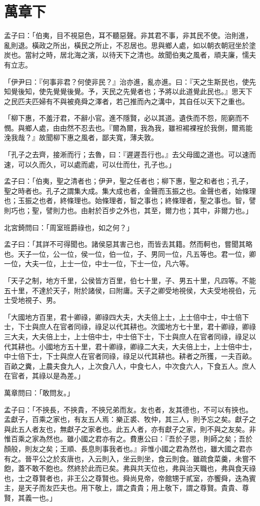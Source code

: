 \documentclass[12pt,a4paper]{ctexbook}
\begin{document}
\section{萬章下}
孟子曰：「伯夷，目不視惡色，耳不聽惡聲。非其君不事，非其民不使。治則進，亂則退。橫政之所出，橫民之所止，不忍居也。思與鄉人處，如以朝衣朝冠坐於塗炭也。當紂之時，居北海之濱，以待天下之清也。故聞伯夷之風者，頑夫廉，懦夫有立志。\par
「伊尹曰：『何事非君？何使非民？』治亦進，亂亦進。曰：『天之生斯民也，使先知覺後知，使先覺覺後覺。予，天民之先覺者也；予將以此道覺此民也。』思天下之民匹夫匹婦有不與被堯舜之澤者，若己推而內之溝中，其自任以天下之重也。\par
「柳下惠，不羞汙君，不辭小官。進不隱賢，必以其道。遺佚而不怨，阨窮而不憫。與鄉人處，由由然不忍去也。『爾為爾，我為我，雖袒裼裸裎於我側，爾焉能浼我哉？』故聞柳下惠之風者，鄙夫寬，薄夫敦。\par
「孔子之去齊，接淅而行；去魯，曰：『遲遲吾行也。』去父母國之道也。可以速而速，可以久而久，可以處而處，可以仕而仕，孔子也。」\par
孟子曰：「伯夷，聖之清者也；伊尹，聖之任者也；柳下惠，聖之和者也；孔子，聖之時者也。孔子之謂集大成。集大成也者，金聲而玉振之也。金聲也者，始條理也；玉振之也者，終條理也。始條理者，智之事也；終條理者，聖之事也。智，譬則巧也；聖，譬則力也。由射於百步之外也，其至，爾力也；其中，非爾力也。」\par
北宮錡問曰：「周室班爵祿也，如之何？」\par
孟子曰：「其詳不可得聞也。諸侯惡其害己也，而皆去其籍。然而軻也，嘗聞其略也。天子一位，公一位，侯一位，伯一位，子、男同一位，凡五等也。君一位，卿一位，大夫一位，上士一位，中士一位，下士一位，凡六等。\par
「天子之制，地方千里，公侯皆方百里，伯七十里，子、男五十里，凡四等。不能五十里，不達於天子，附於諸侯，曰附庸。天子之卿受地視侯，大夫受地視伯，元士受地視子、男。\par
「大國地方百里，君十卿祿，卿祿四大夫，大夫倍上士，上士倍中士，中士倍下士，下士與庶人在官者同祿，祿足以代其耕也。次國地方七十里，君十卿祿，卿祿三大夫，大夫倍上士，上士倍中士，中士倍下士，下士與庶人在官者同祿，祿足以代其耕也。小國地方五十里，君十卿祿，卿祿二大夫，大夫倍上士，上士倍中士，中士倍下士，下士與庶人在官者同祿，祿足以代其耕也。耕者之所獲，一夫百畝。百畝之糞，上農夫食九人，上次食八人，中食七人，中次食六人，下食五人。庶人在官者，其祿以是為差。」\par
萬章問曰：「敢問友。」\par
孟子曰：「不挾長，不挾貴，不挾兄弟而友。友也者，友其德也，不可以有挾也。孟獻子，百乘之家也，有友五人焉：樂正裘、牧仲，其三人，則予忘之矣。獻子之與此五人者友也，無獻子之家者也。此五人者，亦有獻子之家，則不與之友矣。非惟百乘之家為然也。雖小國之君亦有之。費惠公曰：『吾於子思，則師之矣；吾於顏般，則友之矣；王順、長息則事我者也。』非惟小國之君為然也，雖大國之君亦有之。晉平公之於亥唐也，入云則入，坐云則坐，食云則食。雖疏食菜羹，未嘗不飽，蓋不敢不飽也。然終於此而已矣。弗與共天位也，弗與治天職也，弗與食天祿也，士之尊賢者也，非王公之尊賢也。舜尚見帝，帝館甥于貳室，亦饗舜，迭為賓主，是天子而友匹夫也。用下敬上，謂之貴貴；用上敬下，謂之尊賢。貴貴、尊賢，其義一也。」\par
\end{document}
